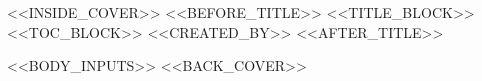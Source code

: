 \documentclass[a4paper, <<FONTSIZE>>]{<<CLASS>>}
\begin{document}
<<INSIDE_COVER>>
<<BEFORE_TITLE>>
<<TITLE_BLOCK>>
<<TOC_BLOCK>>
<<CREATED_BY>>
<<AFTER_TITLE>>

<<BODY_INPUTS>>
<<BACK_COVER>>
\end{document}
